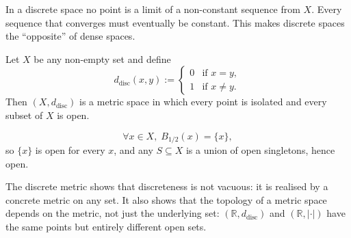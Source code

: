 

\begin{remark*}[Intuition]
In a discrete space no point is a limit of a non-constant sequence from $X$.
Every sequence that converges must eventually be constant.
This makes discrete spaces the ``opposite'' of dense spaces.
\end{remark*}

\begin{proposition}
\label{prop:discrete-metric}
Let $X$ be any non-empty set and define
\[
d_{\mathrm{disc}}(x,y)
:=
\begin{cases}
0 & \text{if } x = y, \\
1 & \text{if } x \neq y.
\end{cases}
\]
Then $(X, d_{\mathrm{disc}})$ is a metric space in which every point is
isolated and every subset of $X$ is open.
\end{proposition}

\begin{remark*}
\[
\forall x \in X,\;
B_{1/2}(x) = \{x\},
\]
so $\{x\}$ is open for every $x$, and any $S \subseteq X$ is a union
of open singletons, hence open.
\end{remark*}

\begin{remark*}[Consequence]
The discrete metric shows that discreteness is not vacuous:
it is realised by a concrete metric on any set.
It also shows that the topology of a metric space depends on the metric,
not just the underlying set: $(\mathbb{R}, d_{\mathrm{disc}})$ and
$(\mathbb{R}, |\cdot|)$ have the same points but entirely different
open sets.
\end{remark*}